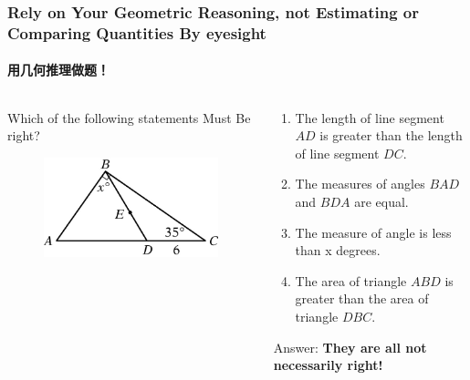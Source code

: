 \documentclass[
	11pt, %
]{beamer}
\begin{document}

\begin{frame}
	\frametitle{Rely on Your Geometric Reasoning, not Estimating or Comparing Quantities By eyesight} %
	\framesubtitle{用几何推理做题！}
	\begin{columns}[t] 
		\begin{column}{0.4\textwidth} %
		Which of the following statements \alert{Must Be} right?
			\begin{figure}
				\includegraphics[width=\linewidth]{Not_Scale.jpg}
			\end{figure}
		\end{column}

	\begin{column}{0.6\textwidth} %
	\begin{enumerate}
		\item The length of line segment $AD$ is greater than the length of line segment $DC$.
		\item The measures of angles $BAD$ and $BDA$ are equal.
		\item The measure of angle is less than x degrees.
		\item The area of triangle $ABD$ is greater than the area of triangle $DBC$.
	\end{enumerate}
	\pause
	Answer: \textbf{\alert{They are all not necessarily right!}}
	\end{column}
	\end{columns}
\end{frame}


\end{document}
